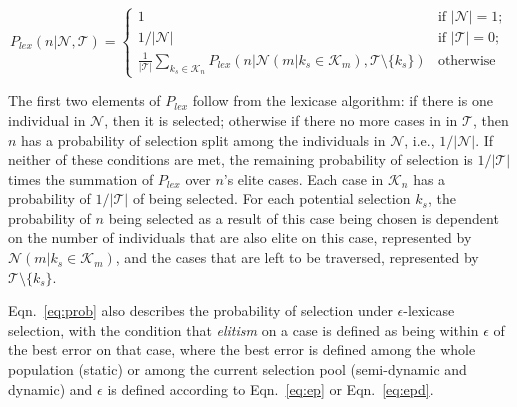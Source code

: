 \documentclass[twoside]{article}
\begin{document}

\begin{equation}\label{eq:prob}
P_{lex}(n | \mathcal{N}, \mathcal{T}) =
\begin{cases}
1 & \text{if } |\mathcal{N}| = 1;\\
1/|\mathcal{N}| & \text{if } |\mathcal{T}| = 0;\\
\frac{1}{|\mathcal{T}|}\sum_{k_s \in \mathcal{K}_n}{P_{lex} \left( n | \mathcal{N}(m|k_s \in \mathcal{K}_m), \mathcal{T} \setminus \{k_s\} \right)} & \text{otherwise}
\end{cases}
\end{equation}

The first two elements of $P_{lex}$ follow from the lexicase algorithm: if there is one individual in $\mathcal{N}$, then it is selected; otherwise if there no more cases in in $\mathcal{T}$, then $n$ has a probability of selection split among the individuals in $\mathcal{N}$, i.e.,  $1/|\mathcal{N}|$. If neither of these conditions are met, the remaining probability of selection is $1/|\mathcal{T}|$ times the summation of $P_{lex}$ over $n$'s elite cases. Each case in $\mathcal{K}_n$ has a probability of $1/|\mathcal{T}|$ of being selected. For each potential selection $k_s$, the probability of $n$ being selected as a result of this case being chosen is dependent on the number of individuals that are also elite on this case, represented by $\mathcal{N}(m|k_s \in \mathcal{K}_m)$, and the cases that are left to be traversed, represented by $\mathcal{T} \setminus \{k_s\}$. 

Eqn.~\ref{eq:prob} also describes the probability of selection under $\epsilon$-lexicase selection, with the condition that {\it elitism} on a case is defined as being within $\epsilon$ of the best error on that case, where the best error is defined among the whole population (static) or among the current selection pool (semi-dynamic and dynamic) and $\epsilon$ is defined according to Eqn.~\ref{eq:ep} or Eqn.~\ref{eq:epd}. 
\end{document}

